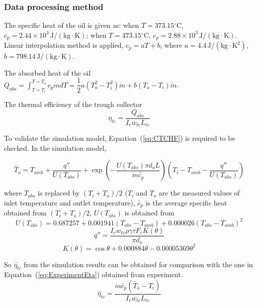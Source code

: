 \subsubsection{Data processing method}
The specific heat of the oil is given as: when $T = 373.15\mathrm{^\circ C}$, $c_p = 2.44\times10^3\,\mathrm{J/(kg\cdot K)}$; when $T = 473.15\mathrm{^\circ C}$, $c_p = 2.88\times10^3\,\mathrm{J/(kg\cdot K)}$. Linear interpolation method is applied, $c_p = aT + b$, where $a = 4.4\,\mathrm{J/(kg \cdot K^2)}$, $b = 798.14\,\mathrm{J/(kg\cdot K)}$.

The absorbed heat of the oil $Q_{abs} = \int_{T=T_i}^{T = T_o}c_p\dot{m}dT = \dfrac{1}{2}a(T_o^2 - T_i^2)\dot{m} + b (T_o - T_i)\dot{m}$.

The thermal efficiency of the trough collector 
\begin{equation}
	\eta_{tc} = \dfrac{Q_{abs}}{I_rw_{tc}L_{tc}}
	\label{eq:ExperimentEta}
\end{equation}

To validate the simulation model, Equation~(\ref{eq:CTCHF}) is required to be checked. In the simulation model,

\begin{equation}
	\widetilde{T_{o}}=T_{amb} + \dfrac{q''}{U(T_{abs})} + \exp(-\frac{U(T_{abs})\pi d_o L}{\dot{m}\widetilde{c_p}})(T_{i}-T_{amb}-\dfrac{q''}{U(T_{abs})})
	\label{eq:CheckT_o}
\end{equation}

where $T_{abs}$ is replaced by $(T_i + T_o)/2$ ($T_i$ and $T_o$ are the measured values of inlet temperature and outlet temperature), $\widetilde{c_p}$ is the average specific heat obtained from $(T_i + T_o)/2$,
$U(T_{abs})$ is obtained from~\cite{Romero2007}
\begin{equation}
	U(T_{abs}) = 0.687257 + 0.001941(T_{abs} - T_{amb}) + 0.000026(T_{abs} - T_{amb})^2
	\label{eq:U_T_abs}
\end{equation}
\begin{equation}
	q'' = \frac{I_r w_{tc} \rho \gamma \tau F_e K(\theta)}{\pi d_o}
\end{equation}
\begin{equation}
	K(\theta) = \cos\theta+0.000884\theta-0.00005369\theta^2
\end{equation}

So $\widetilde{\eta_{tc}}$ from the simulation results can be obtained for comparison with the one in Equation~(\ref{eq:ExperimentEta}) obtained from experiment.
\begin{equation}
	\widetilde{\eta_{tc}} = \dfrac{\dot{m}\widetilde{c_p}(\widetilde{T_o}-T_i)}{I_rw_{tc}L_{tc}}
\end{equation}
	
